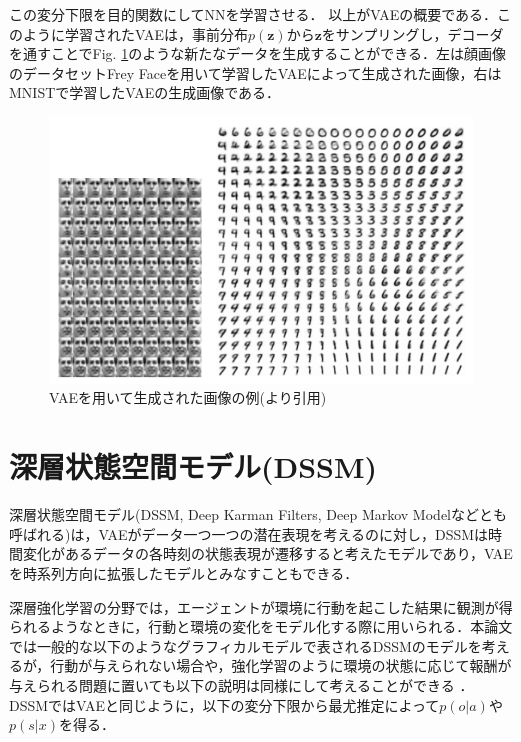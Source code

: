 この変分下限を目的関数にしてNNを学習させる．
以上がVAEの概要である．このように学習されたVAEは，事前分布$p(\bm{z})$から$\bm{z}$をサンプリングし，デコーダを通すことでFig. \ref{fig:vae_example}のような新たなデータを生成することができる．左は顔画像のデータセットFrey Faceを用いて学習したVAEによって生成された画像，右はMNISTで学習したVAEの生成画像である．

\begin{figure}[tbp]
  \begin{center}
    \includegraphics[width=\linewidth]{./figures/vae.png}
    \caption{VAEを用いて生成された画像の例(\cite{vae}より引用)}
    \label{fig:vae_example}
  \end{center}
\end{figure}

\section{深層状態空間モデル(DSSM)}
\label{section:dssm}

深層状態空間モデル(DSSM, Deep Karman Filters, Deep Markov Modelなどとも呼ばれる)は，VAEがデータ一つ一つの潜在表現を考えるのに対し，DSSMは時間変化があるデータの各時刻の状態表現が遷移すると考えたモデルであり，VAEを時系列方向に拡張したモデルとみなすこともできる．

深層強化学習の分野では，エージェントが環境に行動を起こした結果に観測が得られるようなときに，行動と環境の変化をモデル化する際に用いられる．本論文では一般的な以下のようなグラフィカルモデルで表されるDSSMのモデルを考えるが，行動が与えられない場合や，強化学習のように環境の状態に応じて報酬が与えられる問題に置いても以下の説明は同様にして考えることができる
．
DSSMではVAEと同じように，以下の変分下限から最尤推定によって$p(o|a)$や$p(s|x)$を得る．

